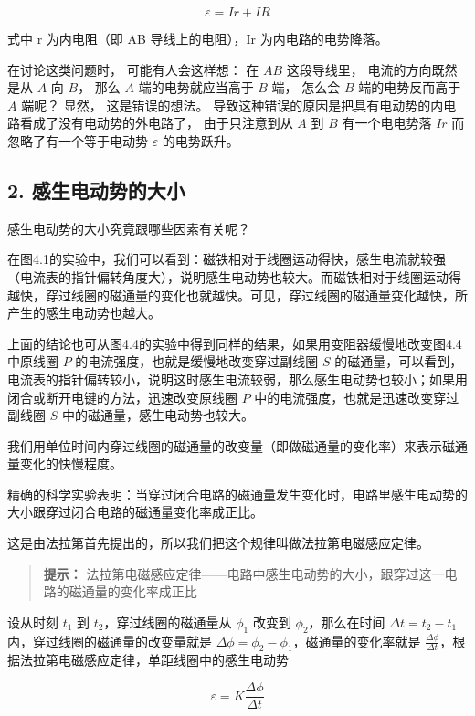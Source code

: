 \[
\varepsilon=Ir+IR
\]

式中 r 为内电阻（即 AB 导线上的电阻），Ir 为内电路的电势降落。

在讨论这类问题时， 可能有人会这样想： 在 \(AB\) 这段导线里，
电流的方向既然是从 \(A\) 向 \(B\)， 那么 \(A\) 端的电势就应当高于 \(B\)
端， 怎么会 \(B\) 端的电势反而高于 \(A\) 端呢？ 显然， 这是错误的想法。
导致这种错误的原因是把具有电动势的内电路看成了没有电动势的外电路了，
由于只注意到从 \(A\) 到 \(B\) 有一个电电势落 \(Ir\)
而忽略了有一个等于电动势 \(\varepsilon\) 的电势跃升。

\subsection{2.
感生电动势的大小}\label{ux611fux751fux7535ux52a8ux52bfux7684ux5927ux5c0f}

感生电动势的大小究竟跟哪些因素有关呢？

在图4.1的实验中，我们可以看到：磁铁相对于线圈运动得快，感生电流就较强（电流表的指针偏转角度大），说明感生电动势也较大。而磁铁相对于线圈运动得越快，穿过线圈的磁通量的变化也就越快。可见，穿过线圈的磁通量变化越快，所产生的感生电动势也越大。

上面的结论也可从图4.4的实验中得到同样的结果，如果用变阻器缓慢地改变图4.4中原线圈
\(P\) 的电流强度，也就是缓慢地改变穿过副线圈 \(S\)
的磁通量，可以看到，电流表的指针偏转较小，说明这时感生电流较弱，那么感生电动势也较小；如果用闭合或断开电键的方法，迅速改变原线圈
\(P\) 中的电流强度，也就是迅速改变穿过副线圈 \(S\)
中的磁通量，感生电动势也较大。

我们用单位时间内穿过线圈的磁通量的改变量（即做磁通量的变化率）来表示磁通量变化的快慢程度。

精确的科学实验表明：当穿过闭合电路的磁通量发生变化时，电路里感生电动势的大小跟穿过闭合电路的磁通量变化率成正比。

这是由法拉第首先提出的，所以我们把这个规律叫做法拉第电磁感应定律。

\begin{quote}
\textbf{提示：}
法拉第电磁感应定律------电路中感生电动势的大小，跟穿过这一电路的磁通量的变化率成正比
\end{quote}

设从时刻 \(t_1\) 到 \(t_2\)，穿过线圈的磁通量从 \(\phi_1\) 改变到
\(\phi_2\)，那么在时间 \(\Delta t = t_2 - t_1\)
内，穿过线圈的磁通量的改变量就是
\(\Delta \phi = \phi_2 - \phi_1\)，磁通量的变化率就是
\(\frac{\Delta \phi}{\Delta t}\)，根据法拉第电磁感应定律，单距线圈中的感生电动势

\[
\varepsilon = K \frac{\Delta \phi}{\Delta t}
\]


